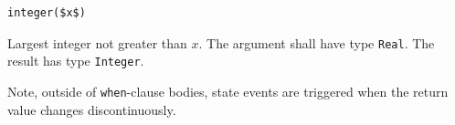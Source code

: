 \begin{operatordefinition}[integer]
\begin{synopsis}\begin{lstlisting}
integer($x$)
\end{lstlisting}\end{synopsis}
\begin{semantics}
Largest integer not greater than $x$.
The argument shall have type \lstinline!Real!.
The result has type \lstinline!Integer!.
\begin{nonnormative}
Note, outside of \lstinline!when!-clause bodies, state events are triggered when the return value changes discontinuously.
\end{nonnormative}
\end{semantics}
\end{operatordefinition}

